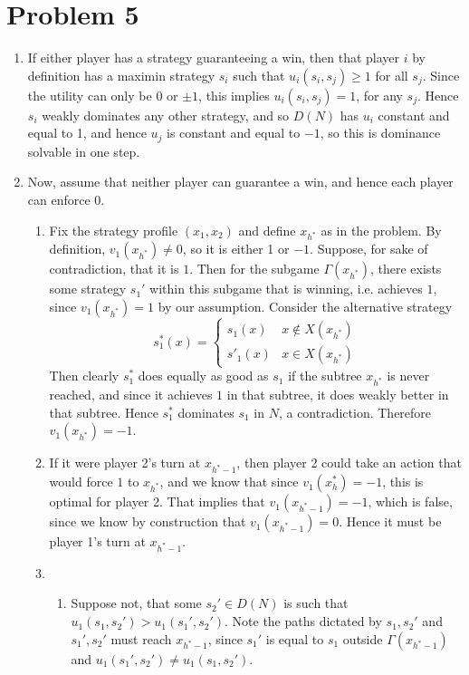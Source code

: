 \documentclass[10pt,letter]{article}
\begin{document}
\section*{Problem 5}
\begin{enumerate}[label=(\alph*)]
\item If either player has a strategy guaranteeing a win, then that player $i$ by definition has a maximin strategy $s_i$ such that $u_i(s_i, s_j) \ge 1$ for all $s_j$. Since the utility can only be $0$ or $\pm 1$, this implies $u_i(s_i, s_j) = 1$, for any $s_j$. Hence $s_i$ weakly dominates any other strategy, and so $D(N)$ has $u_i$ constant and equal to 1, and hence $u_j$ is constant and equal to $-1$, so this is dominance solvable in one step.
\item Now, assume that neither player can guarantee a win, and hence each player can enforce 0. \begin{enumerate}[label=(\roman*)]
  \item Fix the strategy profile $(x_1, x_2)$ and define $x_{h^*}$ as in the problem. By definition, $v_1(x_{h^*}) \neq 0$, so it is either 1 or $-1$. Suppose, for sake of contradiction, that it is $1$. Then for the subgame $\Gamma(x_{h^*})$, there exists some strategy $s_1'$ within this subgame that is winning, i.e. achieves $1$, since $v_1(x_{h^*}) = 1$ by our assumption. Consider the alternative strategy
  \[ s^*_1(x) = \begin{cases}
    s_1(x) & x \not \in X(x_{h^*}) \\
    s'_1(x) & x \in X(x_{h^*})
  \end{cases} \]
  Then clearly $s^*_1$ does equally as good as $s_1$ if the subtree $x_{h^*}$ is never reached, and since it achieves $1$ in that subtree, it does weakly better in that subtree. Hence $s^*_1$ dominates $s_1$ in $N$, a contradiction. Therefore $v_1(x_{h^*}) = -1$.
  \item If it were player 2's turn at $x_{h^* - 1}$, then player 2 could take an action that would force $1$ to $x_{h^*}$, and we know  that since $v_1(x_h^*) = -1$, this is optimal for player 2. That implies that $v_1(x_{h^*-1}) = -1$, which is false, since we know by construction that $v_1(x_{h^* - 1}) = 0$. Hence it must be player 1's turn at $x_{h^* - 1}$.
  \item \begin{enumerate}[label=(\Alph*)]
    \item Suppose not, that some $s_2' \in D(N)$ is such that $u_1(s_1, s_2') > u_1(s_1', s_2')$. Note the paths dictated by $s_1, s_2'$ and $s_1', s_2'$ must reach $x_{h^*-1}$, since $s_1'$ is equal to $s_1$ outside $\Gamma (x_{h^*-1})$ and $u_1(s_1', s_2') \neq u_1(s_1, s_2')$.

\end{enumerate}
\end{enumerate}
\end{enumerate}
\end{document}
